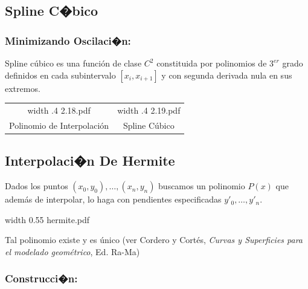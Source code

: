 \documentclass[twoside]{report}
\newcommand{\celeste}[1]{\textcolor{cyan}{#1}}
\newcommand{\colocapdf}[2]{\quad\pdfimage width #2 {#1.pdf}}
\begin{document}
\subsection{Spline C�bico}

\subsubsection{Minimizando Oscilaci�n:}

\begin{df}
Spline c\'{u}bico es una funci\'{o}n de clase $C^2$ constituida por polinomios de $3^{er}$ grado definidos en cada subintervalo $[x_i,x_{i+1}]$ y con segunda derivada nula en sus extremos.
\end{df}

\begin{center}
\begin{tabular}{cc}
\colocapdf{2.18}{.4\textwidth} & \colocapdf{2.19}{.4\textwidth}
\\ Polinomio de Interpolaci\'{o}n &  Spline C\'{u}bico
\end{tabular}
\end{center}


\subsection{Interpolaci�n De Hermite}

Dados los puntos $(x_0,y_0),\ldots,(x_n,y_n)$ buscamos un polinomio $P(x)$ que adem\'{a}s de interpolar, lo haga con pendientes especificadas $y'_0,\ldots,y'_n$.

\begin{center}
\colocapdf{hermite}{0.55\textwidth}
\end{center}

Tal polinomio existe y es \'{u}nico (ver Cordero y Cort\'{e}s, {\it Curvas y Superficies para el modelado geom\'{e}trico}, Ed. Ra-Ma)

\subsubsection{Construcci�n:}
\end{document}
